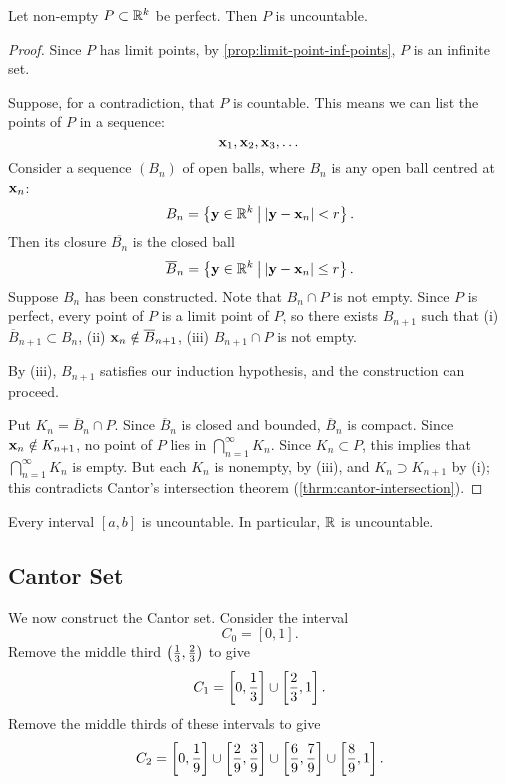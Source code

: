 \begin{proposition}
Let non-empty $P\subset\mathbb R^k$ be perfect. Then $P$ is uncountable.
\end{proposition}

\begin{proof}
Since $P$ has limit points, by \ref{prop:limit-point-inf-points}, $P$ is an infinite set.

Suppose, for a contradiction, that $P$ is countable. This means we can list the points of $P$ in a sequence:
\[\vb{x}_1,\vb{x}_2,\vb{x}_3,\dots\]
Consider a sequence $(B_n)$ of open balls, where $B_n$ is any open ball centred at $\vb{x}_n$:
\[B_n=\left\{\vb{y}\in\mathbb R^k\:\big|\:|\vb{y}-\vb{x}_n|<r\right\}.\]
Then its closure $\overline{B_n}$ is the closed ball
\[\overline{B}_n=\left\{\vb{y}\in\mathbb R^k\:\big|\:|\vb{y}-\vb{x}_n|\le r\right\}.\]
Suppose $B_n$ has been constructed. Note that $B_n\cap P$ is not empty. Since $P$ is perfect, every point of $P$ is a limit point of $P$, so there exists $B_{n+1}$ such that (i) $\overline{B}_{n+1}\subset B_n$, (ii) $\vb{x}_n\notin\overline{B}_{n+1}$, (iii) $B_{n+1}\cap P$ is not empty. 

By (iii), $B_{n+1}$ satisfies our induction hypothesis, and the construction can proceed. 

Put $K_n=\overline{B}_n\cap P$. Since $\overline{B}_n$ is closed and bounded, $\overline{B}_n$ is compact. Since $\vb{x}_n\notin K_{n+1}$, no point of $P$ lies in $\bigcap_{n=1}^{\infty}K_n$. Since $K_n\subset P$, this implies that $\bigcap_{n=1}^{\infty}K_n$ is empty. But each $K_n$ is nonempty, by (iii), and $K_n\supset K_{n+1}$ by (i); this contradicts Cantor's intersection theorem (\ref{thrm:cantor-intersection}).
\end{proof}

\begin{corollary*}
Every interval $[a,b]$ is uncountable. In particular, $\mathbb R$ is uncountable.
\end{corollary*}
\pagebreak

\subsection{Cantor Set}
We now construct the Cantor set. Consider the interval
\[C_0=[0,1].\]
Remove the middle third $\left(\frac{1}{3},\frac{2}{3}\right)$ to give
\[C_1=\left[0,\frac{1}{3}\right]\cup\left[\frac{2}{3},1\right].\]
Remove the middle thirds of these intervals to give
\[C_2=\left[0,\frac{1}{9}\right]\cup\left[\frac{2}{9},\frac{3}{9}\right]\cup\left[\frac{6}{9},\frac{7}{9}\right]\cup\left[\frac{8}{9},1\right].\]

